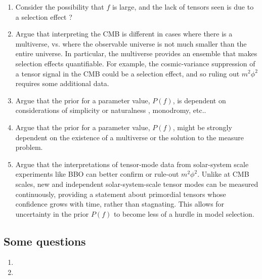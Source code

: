 \documentclass[aps,amsfonts,amsmath,prd,preprint,nofootinbib,superscriptaddress]{revtex4}
\begin{document}
\begin{appendix}
\begin{enumerate}
\item Consider the possibility that $f$ is large, and the lack of tensors seen is due to a selection effect ?

\item Argue that interpreting the CMB is different in cases where there is a multiverse, vs. where the observable universe is not much smaller than the entire universe.  In particular, the multiverse provides an ensemble
that makes selection effects quantifiable.  For example, the cosmic-variance suppression of a tensor signal in the CMB could be a selection effect, and so ruling out $m^2\phi^2$ requires some additional data.  



\item Argue that the prior for a parameter value, $P(f)$, is dependent on considerations of simplicity or naturalness \cite{Musoke:2017frr}, monodromy, etc..

\item Argue that the prior for a parameter value, $P(f)$, might be strongly dependent on the existence of a multiverse or the solution to the measure problem.


\item Argue that the interpretations of tensor-mode data from solar-system scale experiments like BBO can better confirm or rule-out $m^2\phi^2$.  Unlike at CMB scales, new and independent solar-system-scale tensor modes can be measured continuously, providing a statement about primordial tensors whose confidence grows with time, rather than stagnating.  This allows for uncertainty in the prior $P(f)$ to become less of a hurdle in model selection.


\end{enumerate}

\subsection{Some questions}
 
 \begin{enumerate}
 \item
 \item 
 \end{enumerate}





\end{appendix}




  
\end{document}
